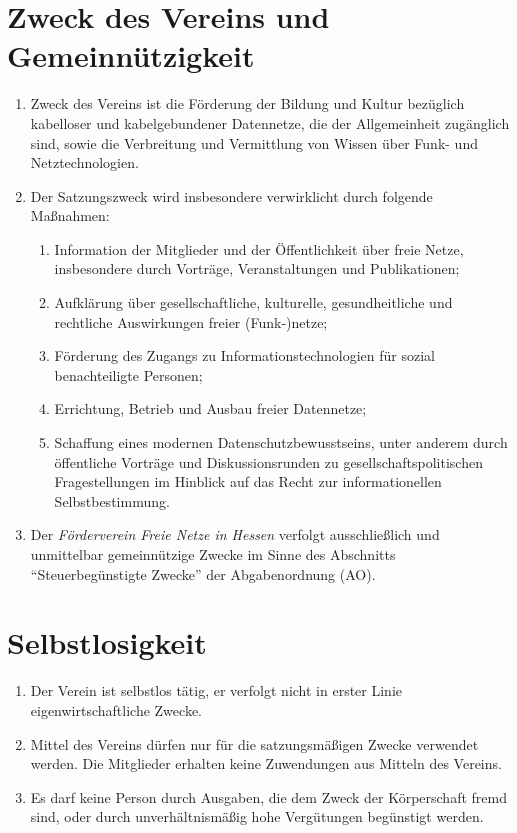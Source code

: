 \documentclass[ngerman]{article}
\newcommand{\NameVerein}{Förderverein Freie Netze in Hessen}
\begin{document}
\section{Zweck des Vereins und Gemeinnützigkeit}
\begin{enumerate}
  \item Zweck des Vereins ist die Förderung der Bildung und Kultur bezüglich kabelloser und kabelgebundener Datennetze, die der Allgemeinheit zugänglich sind, sowie die Verbreitung und Vermittlung von Wissen über Funk- und Netztechnologien.
  \item Der Satzungszweck wird insbesondere verwirklicht durch folgende Maßnahmen:
  \begin{enumerate}
    \item Information der Mitglieder und der Öffentlichkeit über freie Netze, insbesondere durch Vorträge, Veranstaltungen und Publikationen;
    \item Aufklärung über gesellschaftliche, kulturelle, gesundheitliche und rechtliche Auswirkungen freier (Funk-)netze;
    \item Förderung des Zugangs zu Informationstechnologien für sozial benachteiligte Personen;
    \item Errichtung, Betrieb und Ausbau freier Datennetze;
    \item Schaffung eines modernen Datenschutzbewusstseins, unter anderem durch öffentliche Vorträge und Diskussionsrunden zu gesellschaftspolitischen Fragestellungen im Hinblick auf das Recht zur informationellen Selbstbestimmung.
  \end{enumerate}
  \item Der \emph{\NameVerein} verfolgt ausschließlich und unmittelbar gemeinnützige Zwecke im Sinne des Abschnitts "`Steuerbegünstigte Zwecke"' der Abgabenordnung (AO).
\end{enumerate}


\section{Selbstlosigkeit}
\begin{enumerate}
  \item Der Verein ist selbstlos tätig, er verfolgt nicht in erster Linie eigenwirtschaftliche Zwecke.
  \item Mittel des Vereins dürfen nur für die satzungsmäßigen Zwecke verwendet werden. Die Mitglieder erhalten keine Zuwendungen aus Mitteln des Vereins.
  \item Es darf keine Person durch Ausgaben, die dem Zweck der Körperschaft fremd sind, oder durch unverhältnismäßig hohe Vergütungen begünstigt werden.
\end{enumerate}
\end{document}
